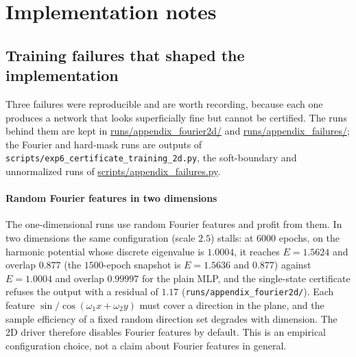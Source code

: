 \section{Implementation notes}
\label{app:impl}

\subsection{Training failures that shaped the implementation}
\label{app:failures}

Three failures were reproducible and are worth recording, because each one
produces a network that looks superficially fine but cannot be certified. The
runs behind them are kept in \url{runs/appendix_fourier2d/} and
\url{runs/appendix_failures/}; the Fourier and hard-mask runs are outputs of
\texttt{scripts/exp6\_certificate\_training\_2d.py}, the soft-boundary and
unnormalized runs of \url{scripts/appendix_failures.py}.

\paragraph{Random Fourier features in two dimensions} The one-dimensional
runs use random Fourier features \citep{tancik2020} and profit from them. In
two dimensions the same configuration (scale $2.5$) stalls: at $6000$ epochs,
on the harmonic potential whose discrete eigenvalue is $1.0004$, it reaches
$E=1.5624$ and overlap $0.877$ (the $1500$-epoch snapshot is $E=1.5636$ and
$0.877$) against $E=1.0004$ and overlap $0.99997$ for the plain MLP, and the
single-state certificate refuses the output with a residual of $1.17$
(\texttt{runs/appendix\_fourier2d/}). Each feature
$\sin/\cos(\omega_1x+\omega_2y)$ must cover a direction in the plane, and the
sample efficiency of a fixed random direction set degrades with dimension. The
2D driver therefore disables Fourier features by default. This is an empirical
configuration choice, not a claim about Fourier features in general.

